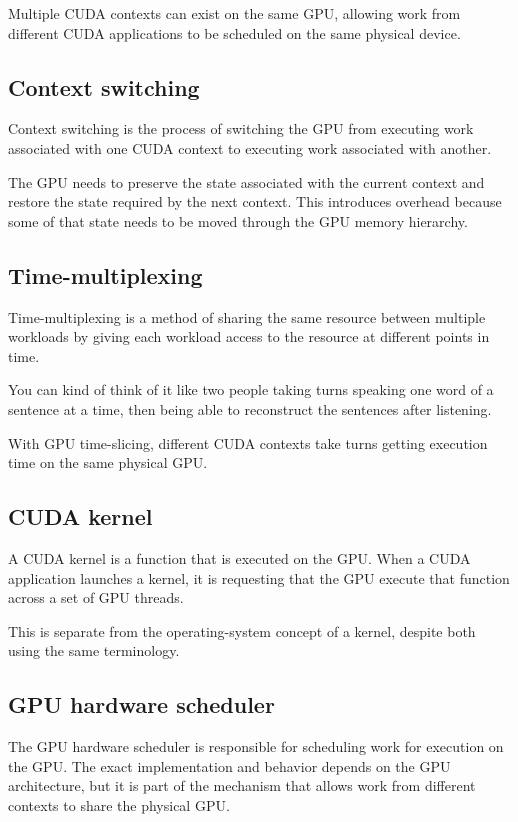 Multiple CUDA contexts can exist on the same GPU, allowing work from different CUDA applications to be scheduled on the same physical device.

\subsection{Context switching}

Context switching is the process of switching the GPU from executing work associated with one CUDA context to executing work associated with another.

The GPU needs to preserve the state associated with the current context and restore the state required by the next context. This introduces overhead because some of that state needs to be moved through the GPU memory hierarchy.

\subsection{Time-multiplexing}

Time-multiplexing is a method of sharing the same resource between multiple workloads by giving each workload access to the resource at different points in time.

You can kind of think of it like two people taking turns speaking one word of a sentence at a time, then being able to reconstruct the sentences after listening.

With GPU time-slicing, different CUDA contexts take turns getting execution time on the same physical GPU.

\subsection{CUDA kernel}

A CUDA kernel is a function that is executed on the GPU. When a CUDA application launches a kernel, it is requesting that the GPU execute that function across a set of GPU threads.

This is separate from the operating-system concept of a kernel, despite both using the same terminology.

\subsection{GPU hardware scheduler}

The GPU hardware scheduler is responsible for scheduling work for execution on the GPU. The exact implementation and behavior depends on the GPU architecture, but it is part of the mechanism that allows work from different contexts to share the physical GPU.

